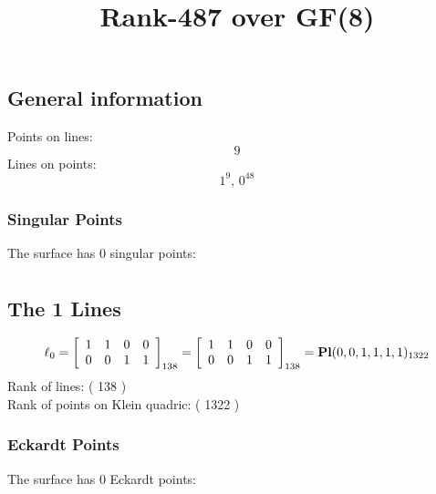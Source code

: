 \documentclass{article}
\newcommand\setTBstruts{\def\T{\rule{0pt}{2.6ex}}%
\def\B{\rule[-1.2ex]{0pt}{0pt}}}
\begin{document}
 
\setTBstruts



{\allowdisplaybreaks%






\title{Rank-487 over GF(8)}
\author{}%
\maketitle%
%
{}



\subsection*{General information}
Points on lines:
$$
9$$
Lines on points:
$$
1^9,\,0^{48}$$
\subsubsection*{Singular Points}
The surface has 0 singular points:\\
\begin{align*}
\end{align*}
\subsection*{The 1 Lines}
$$
\ell_{0} = 
\left[
\begin{array}{*{4}{r}}
1 & 1 & 0 & 0\\
0 & 0 & 1 & 1\\
\end{array}
\right]
_{138}
=
\left[
\begin{array}{*{4}c}
1  & 1  & 0  & 0\\
0  & 0  & 1  & 1\\
\end{array}
\right]_{138}
={\rm\bf Pl}(0,0,1,1,1,1 )_{1322}$$
Rank of lines: ( 138 )\\
Rank of points on Klein quadric: ( 1322 )\\
\subsubsection*{Eckardt Points}
The surface has 0 Eckardt points:\\
}
\end{document}
